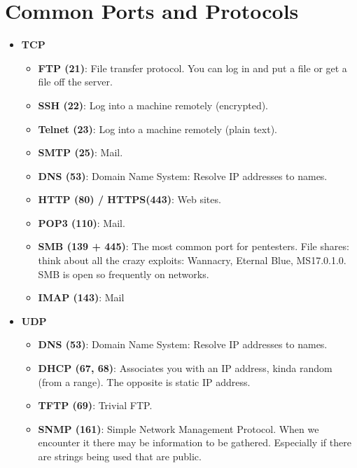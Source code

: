 \documentclass[11pt,a4paper]{article}
\begin{document}
\section{Common Ports and Protocols}

\begin{multicols}{2}
\begin{itemize}
\item \textbf{TCP}
\begin{itemize}
\item \textbf{FTP (21)}: File transfer protocol. You can log in and put a file or get a file off the server.
\item \textbf{SSH (22)}: Log into a machine remotely (encrypted).
\item \textbf{Telnet (23)}: Log into a machine remotely (plain text).
\item \textbf{SMTP (25)}: Mail.
\item \textbf{DNS (53)}: Domain Name System: Resolve IP addresses to names.
\item \textbf{HTTP (80) / HTTPS(443)}: Web sites.
\item \textbf{POP3 (110)}: Mail.
\item \textbf{SMB (139 + 445)}: The most common port for pentesters. File shares: think about all the crazy exploits: Wannacry, Eternal Blue, MS17.0.1.0. SMB is open so frequently on networks.
\item \textbf{IMAP (143)}: Mail
\end{itemize}
\end{itemize}

\vfill\null
\columnbreak
\begin{itemize}
\item \textbf{UDP}
\begin{itemize}
\item \textbf{DNS (53)}: Domain Name System: Resolve IP addresses to names.
\item \textbf{DHCP (67, 68)}: Associates you with an IP address, kinda random (from a range). The opposite is static IP address.
\item \textbf{TFTP (69)}: Trivial FTP.
\item \textbf{SNMP (161)}: Simple Network Management Protocol. When we encounter it there may be information to be gathered. Especially if there are strings being used that are public.
\end{itemize}
\end{itemize}
\end{multicols}
\end{document}
